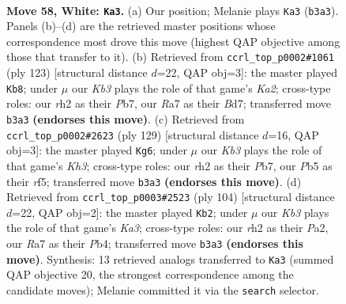 \documentclass[11pt]{article}
\begin{document}
\clearpage

\begin{figure}[p]\centering
\begin{subfigure}{0.46\textwidth}\centering
\resizebox{\linewidth}{!}{%
\newchessgame
\chessboard[
  setfen={8/R7/7k/1P6/P5n1/1K6/7r/8 w - - 2 58},
  showmover=false,
  pgfstyle=straightmove, color=movearrow, markmove={b3-a3}
]}
\caption{}
\end{subfigure}\hfill
\begin{subfigure}{0.46\textwidth}\centering
\resizebox{\linewidth}{!}{%
\newchessgame
\chessboard[
  setfen={8/kp1b4/7r/3N4/1K3P2/4R3/8/8 b - - 2 62},
  showmover=false,
  pgfstyle=straightmove, color=movearrow, markmove={a7-b8}
]}
\caption{}
\end{subfigure}
\\[4pt]
\begin{subfigure}{0.46\textwidth}\centering
\resizebox{\linewidth}{!}{%
\newchessgame
\chessboard[
  setfen={8/1p6/7k/5R2/7b/4N3/1r6/3K4 b - - 1 65},
  showmover=false,
  pgfstyle=straightmove, color=movearrow, markmove={h6-g6}
]}
\caption{}
\end{subfigure}\hfill
\begin{subfigure}{0.46\textwidth}\centering
\resizebox{\linewidth}{!}{%
\newchessgame
\chessboard[
  setfen={8/8/3k4/8/1P2npB1/K7/P7/8 w - - 4 53},
  showmover=false,
  pgfstyle=straightmove, color=movearrow, markmove={a3-b2}
]}
\caption{}
\end{subfigure}
\caption{\textbf{Move 58, White: \texttt{Ka3}.} (a) Our position; Melanie plays \texttt{Ka3} (\texttt{b3a3}). Panels (b)--(d) are the retrieved master positions whose correspondence most drove this move (highest QAP objective among those that transfer to it). (b) Retrieved from \texttt{ccrl\_top\_p0002\#1061} (ply 123) [structural distance $d$=22, QAP obj=3]: the master played \texttt{Kb8}; under $\mu$ our \emph{Kb3} plays the role of that game's \emph{Ka2}; cross-type roles: our \emph{r}h2 as their \emph{P}b7, our \emph{R}a7 as their \emph{B}d7; transferred move \texttt{b3a3} \textbf{(endorses this move)}. (c) Retrieved from \texttt{ccrl\_top\_p0002\#2623} (ply 129) [structural distance $d$=16, QAP obj=3]: the master played \texttt{Kg6}; under $\mu$ our \emph{Kb3} plays the role of that game's \emph{Kh3}; cross-type roles: our \emph{r}h2 as their \emph{P}b7, our \emph{P}b5 as their \emph{r}f5; transferred move \texttt{b3a3} \textbf{(endorses this move)}. (d) Retrieved from \texttt{ccrl\_top\_p0003\#2523} (ply 104) [structural distance $d$=22, QAP obj=2]: the master played \texttt{Kb2}; under $\mu$ our \emph{Kb3} plays the role of that game's \emph{Ka3}; cross-type roles: our \emph{r}h2 as their \emph{P}a2, our \emph{R}a7 as their \emph{P}b4; transferred move \texttt{b3a3} \textbf{(endorses this move)}. Synthesis: 13 retrieved analogs transferred to \texttt{Ka3} (summed QAP objective 20, the strongest correspondence among the candidate moves); Melanie committed it via the \texttt{search} selector.}
\label{fig:thought-m114}
\end{figure}
\end{document}

